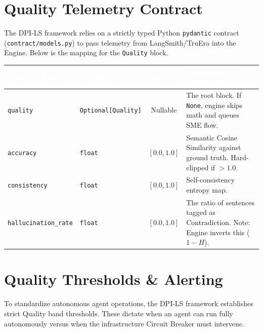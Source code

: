\documentclass[11pt,a4paper]{article}
\begin{document}
\section{Quality Telemetry Contract}

The DPI-LS framework relies on a strictly typed Python \texttt{pydantic} contract (\texttt{contract/models.py}) to pass telemetry from LangSmith/TruEra into the Engine. Below is the mapping for the \texttt{Quality} block.

\vspace{0.5cm}
\begin{center}
\renewcommand{\arraystretch}{1.5}
\begin{tabularx}{\textwidth}{@{} l l c X @{}}
\toprule
\rowcolor{dpiblue} 
\textcolor{white}{\textbf{Contract Field}} & \textcolor{white}{\textbf{Python Type}} & \textcolor{white}{\textbf{Bounds}} & \textcolor{white}{\textbf{Description \& Fallback Rule}} \\
\midrule
\texttt{quality} & \texttt{Optional[Quality]} & Nullable & The root block. If \texttt{None}, engine skips math and queues SME flow. \\
\rowcolor{dpilight}
\texttt{accuracy} & \texttt{float} & $[0.0, 1.0]$ & Semantic Cosine Similarity against ground truth. Hard-clipped if $> 1.0$. \\
\texttt{consistency} & \texttt{float} & $[0.0, 1.0]$ & Self-consistency entropy map. \\
\rowcolor{dpilight}
\texttt{hallucination\_rate} & \texttt{float} & $[0.0, 1.0]$ & The ratio of sentences tagged as Contradiction. Note: Engine inverts this ($1-H$). \\
\bottomrule
\end{tabularx}
\end{center}
\vspace{0.5cm}

\section{Quality Thresholds \& Alerting}

To standardize autonomous agent operations, the DPI-LS framework establishes strict Quality band thresholds. These dictate when an agent can run fully autonomously versus when the infrastructure Circuit Breaker must intervene.
\end{document}
